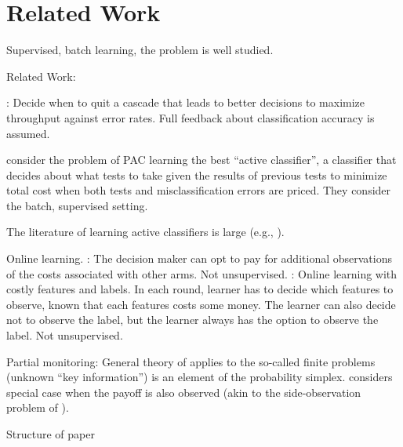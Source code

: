 %
%

\section{Related Work}

Supervised, batch learning, the problem is well studied.

Related Work: \cite{AISTATS13_SupervisedSequentialLearning_TrapezSaligram}

\cite{poczos2009}: Decide when to quit a cascade that leads to better decisions to maximize throughput against error rates. Full feedback about classification accuracy is assumed.

\citet{ActiveClass-AIJ-s} consider the problem of PAC learning the best ``active classifier'',
a classifier that decides about what tests to take given the results of previous tests
to minimize total cost when both tests and misclassification errors are priced.
They consider the batch, supervised setting. 

The literature of learning active classifiers is large 
(e.g., \citep{LCunderBudget-ECML05,ADORE-99,isukapalli01efficient-ICJAI}).


Online learning.
\cite{SBCA14:BanditsPaid}: The decision maker can opt to pay for additional observations of the costs associated with other arms. Not unsupervised.
\citet{ZBGGySz13:CostlyFeatures}: Online learning with costly features and labels.
In each round, learner has to decide which features to observe, known that each features costs 
some money. The learner can also decide not to observe the label, but the learner always has the option
to observe the label. Not unsupervised.

Partial monitoring:
General theory of \citet{BaFoPaRaSze14} 
applies to the so-called finite problems (unknown ``key information'') is an element of the probability simplex.
\citet{AgTeAn89:pmon} considers special case when the payoff is also observed (akin to the side-observation problem of \citet{MaSh11}).

Structure of paper
